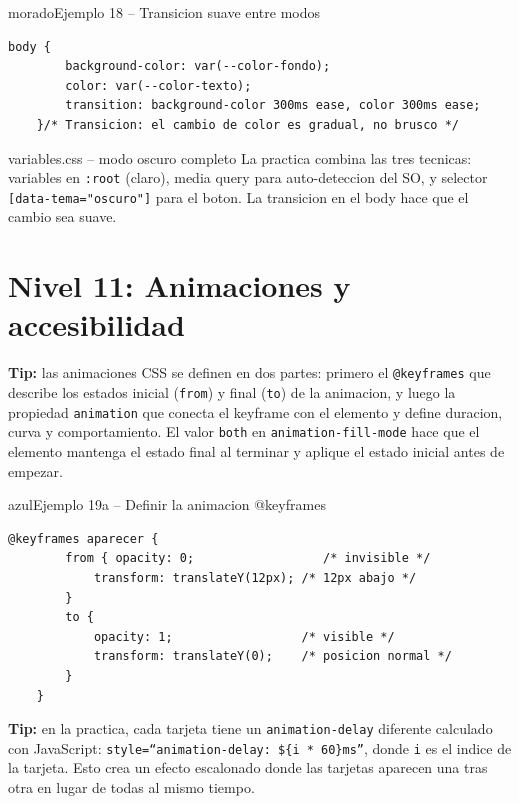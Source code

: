 \documentclass[11pt,a4paper]{article}
\begin{document}
	\begin{cajacodigo}{morado}{Ejemplo 18 -- Transicion suave entre modos}
		\begin{lstlisting}[style=codecss]
	body {
		background-color: var(--color-fondo);
		color: var(--color-texto);
		transition: background-color 300ms ease, color 300ms ease;
	}/* Transicion: el cambio de color es gradual, no brusco */ \end{lstlisting}
	\end{cajacodigo}
	
	\begin{cajapractica}{variables.css -- modo oscuro completo}
		La practica combina las tres tecnicas: variables en \texttt{:root} (claro), media query para auto-deteccion del SO, y selector \texttt{[data-tema="oscuro"]} para el boton. La transicion en el body hace que el cambio sea suave.
	\end{cajapractica}
	
	\section{Nivel 11: Animaciones y accesibilidad}
	\textbf{Tip:} las animaciones CSS se definen en dos partes: primero el \texttt{@keyframes} que describe los estados inicial (\texttt{from}) y final (\texttt{to}) de la animacion, y luego la propiedad \texttt{animation} que conecta el keyframe con el elemento y define duracion, curva y comportamiento. El valor \texttt{both} en \texttt{animation-fill-mode} hace que el elemento mantenga el estado final al terminar y aplique el estado inicial antes de empezar.
	
	\begin{cajacodigo}{azul}{Ejemplo 19a -- Definir la animacion @keyframes}
		\begin{lstlisting}[style=codecss]
	@keyframes aparecer {
		from { opacity: 0;                  /* invisible */
			transform: translateY(12px); /* 12px abajo */
		}
		to { 
			opacity: 1;                  /* visible */
			transform: translateY(0);    /* posicion normal */
		}
	} \end{lstlisting}
	\end{cajacodigo}
	
	\textbf{Tip:} en la practica, cada tarjeta tiene un \texttt{animation-delay} diferente calculado con JavaScript: \texttt{style=``animation-delay: \$\{i * 60\}ms''}, donde \texttt{i} es el indice de la tarjeta. Esto crea un efecto escalonado donde las tarjetas aparecen una tras otra en lugar de todas al mismo tiempo.
	
\end{document}
